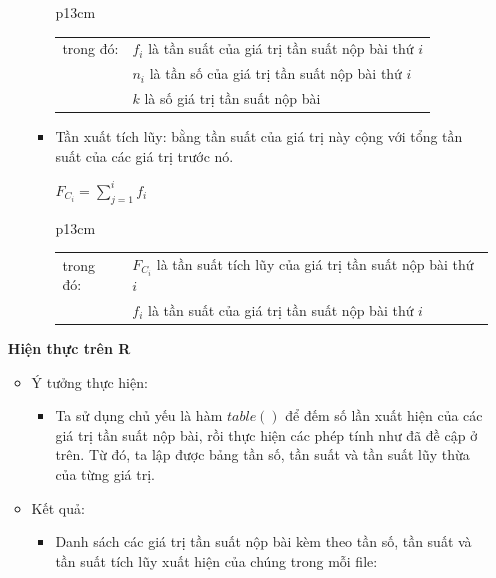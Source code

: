 \documentclass[a4paper]{article}
\theoremstyle{definition}
\begin{document}
\begin{enumerate}[a)]
\begin{itemize}
\begin{itemize}
\begin{center}
\begin{tabular}{p{13cm}}
\begin{tabular}{l l}
                          trong đó: & $f_i$ là tần suất của giá trị tần suất nộp bài thứ $i$\\
                          & $n_i$ là tần số của giá trị tần suất nộp bài thứ $i$\\
                          & $k$ là số giá trị tần suất nộp bài
                     \end{tabular}
                \end{tabular}
            \end{center}
            \item Tần xuất tích lũy: bằng tần suất của giá trị này cộng với tổng tần suất của các giá trị trước nó.
            \begin{center}
                $F_{C_i} = \sum \limits_{j = 1}^{i} f_i$\\
                \begin{tabular}{p{13cm}}
                     \begin{tabular}{l l}
                          trong đó: & $F_{C_i}$ là tần suất tích lũy của giá trị tần suất nộp bài thứ $i$\\
                          & $f_i$ là tần suất của giá trị tần suất nộp bài thứ $i$
                     \end{tabular}
                \end{tabular}
            \end{center}
        \end{itemize}
    \end{itemize}
    \bf Hiện thực trên R\normalfont
    \begin{itemize}
        \item Ý tưởng thực hiện:
        \begin{itemize}
            \item Ta sử dụng chủ yếu là hàm $table()$ để đếm số lần xuất hiện của các giá trị tần suất nộp bài, rồi thực hiện các phép tính như đã đề cập ở trên. Từ đó, ta lập  được bảng tần số, tần suất và tần suất lũy thừa của từng giá trị.
        \end{itemize}
        \item Kết quả:
        \begin{itemize}
            \item Danh sách các giá trị tần suất nộp bài kèm theo tần số, tần suất và tần suất tích lũy xuất hiện của chúng trong mỗi file:
            \begin{center}
                \begin{tabular}{l c c c c}

\end{tabular}
\end{center}
\end{itemize}
\end{itemize}
\end{enumerate}
\end{document}
